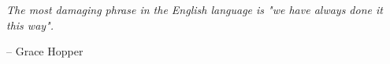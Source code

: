 \epigraph{\textit{The most damaging phrase in the English language is "we have always done it this way".}}{-- \textup{Grace Hopper}}